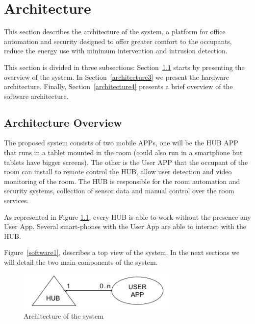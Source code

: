 \chapter{Architecture}
\label{chapter:architecture}

This section describes the architecture of the system, a platform for office automation and security designed to offer greater comfort to the occupants, reduce the energy use with minimum intervention and intrusion detection.

This section is divided in three subsections: Section~\ref{architecture2} starts by presenting the overview of the system. In Section~\ref{architecture3} we present the hardware architecture. Finally, Section~\ref{architecture4} presents a brief overview of the software architecture.


\section{Architecture Overview}\label{architecture2} 


The proposed system consists of two mobile APPs, one will be the HUB APP that runs in a tablet mounted in the room (could also run in a smartphone but tablets have bigger screens). The other is the User APP that the occupant of the room can install to remote control the HUB, allow user detection and video monitoring of the room. The HUB is responsible for the room automation and security systems, collection of sensor data and manual control over the room services.


As represented in Figure \ref{architecture_system}, every HUB is able to work without the presence any User App. Several smart-phones with the User App are able to interact with the HUB.

Figure~\ref{software1}, describes a top view of the system. In the next sections we will detail the two main components of the system.

\begin{figure}[h]
\centering
\includegraphics[width=0.7\textwidth]{Figures/system_architecture}
\caption{Architecture of the system}
\label{architecture_system}
\end{figure}

